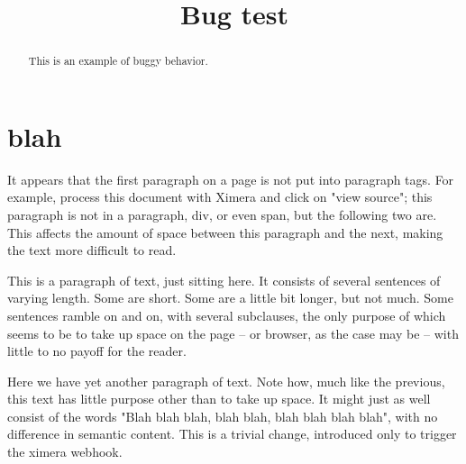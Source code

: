 \documentclass{ximera}
\title{Bug test}
\begin{document}
\begin{abstract}
This is an example of buggy behavior.
\end{abstract}
\maketitle

\section{blah}

It appears that the first paragraph on a page is not put into paragraph tags. For example, process this document with Ximera and click on "view source"; this paragraph is not in a paragraph, div, or even span, but the following two are. This affects the amount of space between this paragraph and the next, making the text more difficult to read.

This is a paragraph of text, just sitting here. It consists of several sentences of varying length. Some are short. Some are a little bit longer, but not much. Some sentences ramble on and on, with several subclauses, the only purpose of which seems to be to take up space on the page -- or browser, as the case may be -- with little to no payoff for the reader.

Here we have yet another paragraph of text. Note how, much like the previous, this text has little purpose other than to take up space. It might just as well consist of the words "Blah blah blah, blah blah, blah blah blah blah", with no difference in semantic content. This is a trivial change, introduced only to trigger the ximera webhook.
\end{document}
